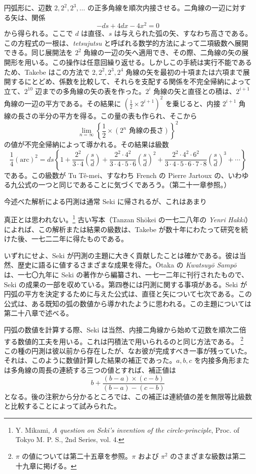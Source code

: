 \documentclass[11pt]{article}
\newcommand{\scanpage}[2]{\clearpage\setcounter{footnote}{0}\noindent{\footnotesize\color{gray}PDF #1 頁 · #2}\par\medskip}
\newcommand{\scanfooter}{}
\begin{document}
円弧形に、辺数 $2,2^2,2^3,\ldots$ の正多角線を順次内接させる。二角線の一辺に対する矢は、関係
\[
-ds+4dx-4x^2=0
\]
から得られる。ここで $d$ は直径、$s$ は与えられた弧の矢、すなわち高さである。この方程式の一根は、\emph{tetsujutsu} と呼ばれる数学的方法によって二項級数へ展開できる。同じ展開法を $2^2$ 角線の一辺の矢へ適用でき、その際、二角線の矢の展開形を用いる。この操作は任意回繰り返せる。しかしこの手続は実行不能であるため、Takebe はこの方法で $2,2^2,2^3,2^4$ 角線の矢を最初の十項または六項まで展開するにとどめ、係数を比較して、それらを支配する関係を不完全帰納によって立て、$2^{10}$ 辺までの多角線の矢の表を作った。$2^i$ 角線の矢と直径との積は、$2^{i+1}$ 角線の一辺の平方である。その結果に $\left(\frac12\times2^{i+1}\right)^2$ を乗じると、内接 $2^{i+1}$ 角線の長さの半分の平方を得る。この量の表も作られ、そこから
\[
\lim_{n=\infty}\left\{\frac12\times(\text{$2^n$ 角線の長さ})\right\}^{2}
\]
の値が不完全帰納によって導かれる。その結果は級数
\[
\frac14(\mathrm{arc})^2
=ds\left\{1+\frac{2^2}{3\cdot4}\left(\frac{s}{d}\right)
+\frac{2^2\cdot4^2}{3\cdot4\cdot5\cdot6}\left(\frac{s}{d}\right)^2
+\frac{2^2\cdot4^2\cdot6^2}{3\cdot4\cdot5\cdot6\cdot7\cdot8}\left(\frac{s}{d}\right)^3+\cdots\right\}
\]
である。この級数が Tu Tê-mei、すなわち French の Pierre Jartoux の、いわゆる九公式の一つと同じであることに気づくであろう。（第二十一章参照。）

今述べた解析による円測は通常 Seki に帰されるが、これはあまり
\scanfooter

\scanpage{0179}{第22章、印刷頁165}
真正とは思われない。\footnote{Y. Mikami, \emph{A question on Seki's invention of the circle-principle}, Proc. of Tokyo M. P. S., 2nd Series, vol. 4.}
古い写本（Tanzan Shōkei の一七二八年の \emph{Yenri Hakki}）によれば、この解析または結果の級数は、Takebe が数十年にわたって研究を続けた後、一七二二年に得たものである。

いずれにせよ、Seki が円測の主題に大きく貢献したことは確かである。彼は当然、歴史に語るに値するさまざまな成果を得た。Ōtaka の \emph{Kwatsuyō Sampō} は、一七〇九年に Seki の著作から編纂され、一七一二年に刊行されたもので、Seki の成果の一部を収めている。第四巻には円測に関する事項がある。Seki が円弧の平方を決定するために与えた公式は、直径と矢について七次である。この公式は、ある既知の弧の数値から導かれたように思われる。この主題については第二十八章で述べる。

円弧の数値を計算する際、Seki は当然、内接二角線から始めて辺数を順次二倍する数値的工夫を用いる。これは円積法で用いられるのと同じ方法である。
\footnote{$\pi$ の値については第二十五章を参照。$\pi$ および $\pi^2$ のさまざまな級数は第二十九章に掲げる。}
この種の円測は彼以前から存在したが、なお彼が完成すべき一事が残っていた。それは、このように数値計算した結果の補正であった。$a,b,c$ を内接多角形または多角線の周長の連続する三つの値とすれば、補正値は
\[
b+\frac{(b-a)\times(c-b)}{(b-a)-(c-b)}
\]
となる。後の注釈から分かるところでは、この補正は連続値の差を無限等比級数と比較することによって試みられた。
\end{document}
